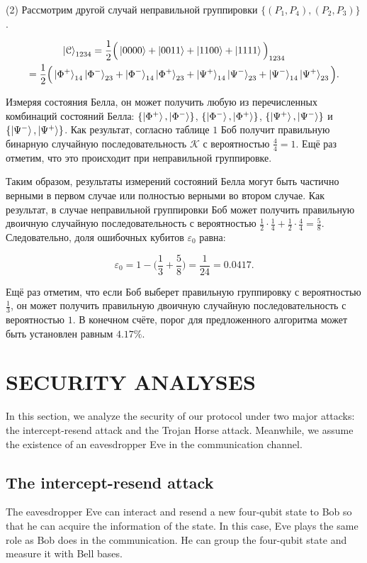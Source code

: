 \documentclass[a4paper,11pt]{article}
\begin{document}
(2) Рассмотрим другой случай неправильной группировки $\{(P_1, P_4), (P_2, P_3)\}$.

\begin{align*}
\ket{\mathcal{C}}_{1234} = \dfrac{1}{2} \Big(\ket{0000} + \ket{0011}
&+ \ket{1100} + \ket{1111} \Big)_{1234} \nonumber\\
 = \dfrac{1}{2} \Big(
\ket{\Phi^+}_{14} \ket{\Phi^-}_{23} + \ket{\Phi^-}_{14} \ket{\Phi^+}_{23} &+ 
\ket{\Psi^+}_{14} \ket{\Psi^-}_{23} + \ket{\Psi^-}_{14} \ket{\Psi^+}_{23} \Big).
\end{align*}

Измеряя состояния Белла, он может получить любую из перечисленных комбинаций состояний Белла: $\{\ket{\Phi^+}, \ket{\Phi^-}\}$, $\{\ket{\Phi^-}, \ket{\Phi^+}\}$, $\{\ket{\Psi^+}, \ket{\Psi^-}\}$ и $\{\ket{\Psi^-}, \ket{\Psi^+}\}$. Как результат, согласно таблице $1$ Боб получит правильную бинарную случайную последовательность $\mathcal{K}$ с вероятностью $\frac{4}{4} = 1$. Ещё раз отметим, что это происходит при неправильной группировке.

Таким образом, результаты измерений состояний Белла могут быть частично верными в первом случае или полностью верными во втором случае. Как результат, в случае неправильной группировки Боб может получить правильную двоичную случайную последовательность с вероятностью $\frac{1}{2} \cdot \frac{1}{4} + \frac{1}{2} \cdot \frac{4}{4} = \frac{5}{8}$. Следовательно, доля ошибочных кубитов $\varepsilon_0$ равна:

\begin{equation*}
\varepsilon_0 = 1 - \Big(\dfrac{1}{3} + \dfrac{5}{8}\Big) = \dfrac{1}{24} = 0.0417.
\end{equation*}

Ещё раз отметим, что если Боб выберет правильную группировку с вероятностью $\frac{1}{3}$, он может получить правильную двоичную случайную последовательность с вероятностью $1$. В конечном счёте, порог для предложенного алгоритма может быть установлен равным $4.17\%$.

\section{SECURITY ANALYSES}
In this section, we analyze the security of our protocol under two major attacks: the intercept-resend attack and the Trojan Horse attack. Meanwhile, we assume the existence of
an eavesdropper Eve in the communication channel.

\subsection{The intercept-resend attack}
The eavesdropper Eve can interact and resend a new four-qubit state to Bob so that he can acquire the information of the state. In this case, Eve plays the same role as Bob does in the communication. He can group the four-qubit state and measure it with Bell bases.
\end{document}
